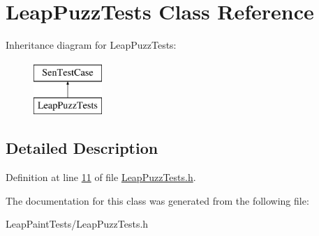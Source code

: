 \hypertarget{interface_leap_puzz_tests}{\section{Leap\-Puzz\-Tests Class Reference}
\label{da/da0/interface_leap_puzz_tests}
}
Inheritance diagram for Leap\-Puzz\-Tests\-:\begin{figure}[H]
\begin{center}
\leavevmode
\includegraphics[height=2.000000cm]{da/da0/interface_leap_puzz_tests}
\end{center}
\end{figure}


\subsection{Detailed Description}


Definition at line \hyperlink{_leap_puzz_tests_8h_source_l00011}{11} of file \hyperlink{_leap_puzz_tests_8h_source}{Leap\-Puzz\-Tests.\-h}.



The documentation for this class was generated from the following file\-:\begin{DoxyCompactItemize}
\item 
Leap\-Paint\-Tests/Leap\-Puzz\-Tests.\-h\end{DoxyCompactItemize}
